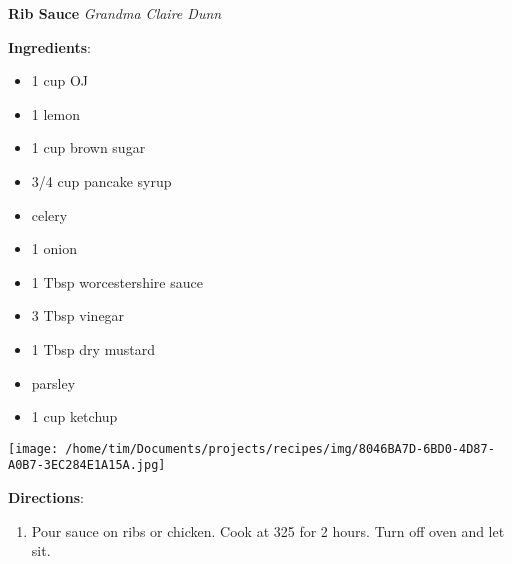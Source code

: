 \documentclass[11pt, twoside, openany]{book}
\begin{document}
\noindent\begin{minipage}[t]{\linewidth}%
{\Large\textbf{Rib Sauce}} \label{rib-sauce}\hfill\textit{Grandma Claire Dunn}\\
\noindent\begin{minipage}[t]{0.78\linewidth}%
\textbf{Ingredients}:\vspace{-3mm}
\begin{multicols}{2}
\begin{itemize}\setlength\itemsep{-1mm}
\item 1 cup OJ
\item 1 lemon
\item 1 cup brown sugar
\item 3/4 cup pancake syrup
\item celery
\item 1 onion
\item 1 Tbsp worcestershire sauce
\item 3 Tbsp vinegar
\item 1 Tbsp dry mustard
\item parsley
\item 1 cup ketchup
\end{itemize}
\end{multicols}
\end{minipage}
\noindent\begin{minipage}[t]{0.18\linewidth}
\centering \strut\vspace*{-\baselineskip}\newline
\texttt{[image: /home/tim/Documents/projects/recipes/img/8046BA7D-6BD0-4D87-A0B7-3EC284E1A15A.jpg]}\\
\end{minipage}\vspace{3mm}
\textbf{Directions}:
\vspace{-3mm}\begin{enumerate}\setlength\itemsep{-1mm}
\item Pour sauce on ribs or chicken. Cook at 325 for 2 hours. Turn off oven and let sit.
\end{enumerate}
\end{minipage}\vspace{8mm}
\end{document}
